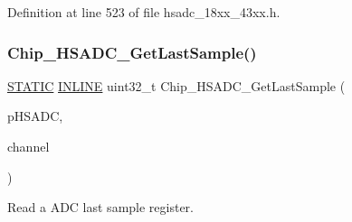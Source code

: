 Definition at line 523 of file hsadc\+\_\+18xx\+\_\+43xx.\+h.

\mbox{\label{group___h_s_a_d_c__18_x_x__43_x_x_ga6bcc415a97846f5d97ebd62a7606606f}} 
\subsubsection{\texorpdfstring{Chip\+\_\+\+H\+S\+A\+D\+C\+\_\+\+Get\+Last\+Sample()}{Chip\_HSADC\_GetLastSample()}}
{\footnotesize\ttfamily \hyperlink{group___l_p_c___types___public___macros_ga10b2d890d871e1489bb02b7e70d9bdfb}{S\+T\+A\+T\+IC} \hyperlink{spifi__18xx__43xx_8h_a2eb6f9e0395b47b8d5e3eeae4fe0c116}{I\+N\+L\+I\+NE} uint32\+\_\+t Chip\+\_\+\+H\+S\+A\+D\+C\+\_\+\+Get\+Last\+Sample (\begin{DoxyParamCaption}\item[{\hyperlink{struct_l_p_c___h_s_a_d_c___t}{L\+P\+C\+\_\+\+H\+S\+A\+D\+C\+\_\+T} $\ast$}]{p\+H\+S\+A\+DC,  }\item[{uint8\+\_\+t}]{channel }\end{DoxyParamCaption})}



Read a A\+DC last sample register. 


